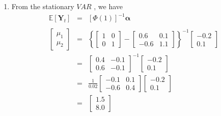 \documentclass[oneside,openany]{tufte-book} %
\begin{document}
\begin{enumerate}
\begin{enumerate}
	
	\item From the stationary $VAR$ , we have%
	\begin{eqnarray*}
		\mathbb{E}[\textbf{Y}_t] &=&[\Phi (1)]^{-1}\bm{\alpha } \\
		&& \\
		\left[
		\begin{array}{c}
			\mu _{1} \\
			\mu _{2}%
		\end{array}%
		\right] &=&\left\{ \left[
		\begin{array}{cc}
			1 & 0 \\
			0 & 1%
		\end{array}%
		\right] -\left[
		\begin{array}{cc}
			0.6 & 0.1 \\
			-0.6 & 1.1%
		\end{array}%
		\right] \right\} ^{-1}\left[
		\begin{array}{c}
			-0.2 \\
			0.1%
		\end{array}%
		\right] \\
		&=&\left[
		\begin{array}{cc}
			0.4 & -0.1 \\
			0.6 & -0.1%
		\end{array}%
		\right] ^{-1}\left[
		\begin{array}{c}
			-0.2 \\
			0.1%
		\end{array}%
		\right] \\
		&=&\frac{1}{0.02}\left[
		\begin{array}{cc}
			-0.1 & 0.1 \\
			-0.6 & 0.4%
		\end{array}%
		\right] \left[
		\begin{array}{c}
			-0.2 \\
			0.1%
		\end{array}%
		\right] \\
		&=&\left[
		\begin{array}{c}
			1.5 \\
			8.0%
		\end{array}%
		\right]
	\end{eqnarray*}%
	\medskip


\end{enumerate}
\end{enumerate}
\end{document}
